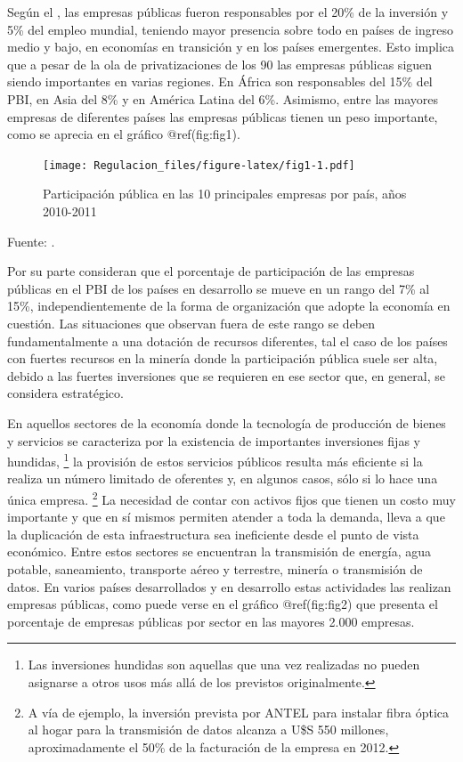 \documentclass[
  12pt,
  spanish,
]{book}
\begin{document}
Según el \citet{Robinett2006}, las empresas públicas fueron responsables
por el 20\% de la inversión y 5\% del empleo mundial, teniendo mayor
presencia sobre todo en países de ingreso medio y bajo, en economías en
transición y en los países emergentes. Esto implica que a pesar de la
ola de privatizaciones de los 90 las empresas públicas siguen siendo
importantes en varias regiones. En África son responsables del 15\% del
PBI, en Asia del 8\% y en América Latina del 6\%. Asimismo, entre las
mayores empresas de diferentes países las empresas públicas tienen un
peso importante, como se aprecia en el gráfico @ref(fig:fig1).

\begin{figure}
\centering
\texttt{[image: Regulacion\_files/figure-latex/fig1-1.pdf]}
\caption{Participación pública en las 10 principales empresas por país,
años 2010-2011}
\end{figure}

Fuente: \citet{Kowalski2013}.

Por su parte \citet{Jones1982} consideran que el porcentaje de
participación de las empresas públicas en el PBI de los países en
desarrollo se mueve en un rango del 7\% al 15\%, independientemente de
la forma de organización que adopte la economía en cuestión. Las
situaciones que observan fuera de este rango se deben fundamentalmente a
una dotación de recursos diferentes, tal el caso de los países con
fuertes recursos en la minería donde la participación pública suele ser
alta, debido a las fuertes inversiones que se requieren en ese sector
que, en general, se considera estratégico.

En aquellos sectores de la economía donde la tecnología de producción de
bienes y servicios se caracteriza por la existencia de importantes
inversiones fijas y hundidas, \footnote{Las inversiones hundidas son
  aquellas que una vez realizadas no pueden asignarse a otros usos más
  allá de los previstos originalmente.} la provisión de estos servicios
públicos resulta más eficiente si la realiza un número limitado de
oferentes y, en algunos casos, sólo si lo hace una única empresa.
\footnote{A vía de ejemplo, la inversión prevista por ANTEL para
  instalar fibra óptica al hogar para la transmisión de datos alcanza a
  U\$S 550 millones, aproximadamente el 50\% de la facturación de la
  empresa en 2012.} La necesidad de contar con activos fijos que tienen
un costo muy importante y que en sí mismos permiten atender a toda la
demanda, lleva a que la duplicación de esta infraestructura sea
ineficiente desde el punto de vista económico. Entre estos sectores se
encuentran la transmisión de energía, agua potable, saneamiento,
transporte aéreo y terrestre, minería o transmisión de datos. En varios
países desarrollados y en desarrollo estas actividades las realizan
empresas públicas, como puede verse en el gráfico @ref(fig:fig2) que
presenta el porcentaje de empresas públicas por sector en las mayores
2.000 empresas.
\end{document}

